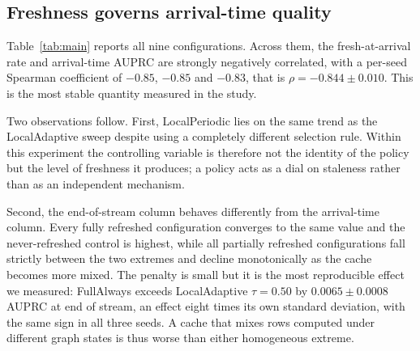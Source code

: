 \documentclass[conference]{IEEEtran}
\begin{document}
\subsection{Freshness governs arrival-time quality}

Table~\ref{tab:main} reports all nine configurations. Across them, the
fresh-at-arrival rate and arrival-time AUPRC are strongly negatively
correlated, with a per-seed Spearman coefficient of $-0.85$, $-0.85$ and
$-0.83$, that is $\rho = -0.844 \pm 0.010$. This is the most stable quantity
measured in the study.

Two observations follow. First, LocalPeriodic lies on the same trend as the
LocalAdaptive sweep despite using a completely different selection rule. Within
this experiment the controlling variable is therefore not the identity of the
policy but the level of freshness it produces; a policy acts as a dial on
staleness rather than as an independent mechanism.

Second, the end-of-stream column behaves differently from the arrival-time
column. Every fully refreshed configuration converges to the same value and the
never-refreshed control is highest, while all partially refreshed
configurations fall strictly between the two extremes and decline monotonically
as the cache becomes more mixed. The penalty is small but it is the most
reproducible effect we measured: FullAlways exceeds LocalAdaptive
$\tau{=}0.50$ by $0.0065 \pm 0.0008$ AUPRC at end of stream, an effect eight
times its own standard deviation, with the same sign in all three seeds. A
cache that mixes rows computed under different graph states is thus worse than
either homogeneous extreme.
\end{document}
